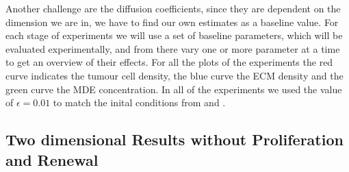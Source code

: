 Another challenge are the diffusion coefficients, since they are dependent on the dimension we are in, we have to find our own estimates as a baseline value. \newline 
For each stage of experiments we will use a set of baseline parameters, which will be evaluated experimentally, and from there vary one or more parameter at a time to get an overview of their effects. \newline
For all the plots of the experiments the red curve indicates the tumour cell density, the blue curve the ECM density and the green curve the MDE concentration. In all of the experiments we used the value of $\epsilon = 0.01$ to match the inital conditions from \cite{anderson_mathematical_2000} and \cite{Kolev2010}. \newline 


\subsection{Two dimensional Results without Proliferation and Renewal}

